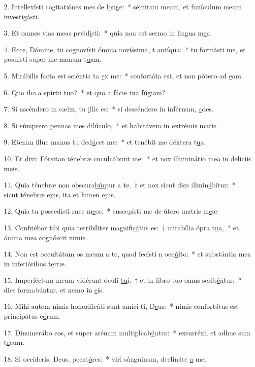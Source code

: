 2. Intellexísti cogitatiónes mes de l\uline{o}nge:~* sémitam meam, et funículum meum investig\uline{á}sti.\par 
3. Et omnes vias meas prvid\uline{í}sti:~* quia non est sermo in lingua m\uline{e}a.\par 
4. Ecce, Dómine, tu cognovísti ómnia novíssima, t ant\uline{í}qua:~* tu formásti me, et posuísti super me manum t\uline{u}am.\par 
5. Mirábilis facta est sciéntia ta \uline{e}x me:~* confortáta est, et non pótero ad \uline{e}am.\par 
6. Quo ibo a spírtu t\uline{u}o?~* et quo a fácie tua f\uline{ú}giam?\par 
7. Si ascéndero in cælm, tu \uline{i}llic es:~* si descéndero in inférnum, \uline{a}des.\par 
8. Si súmpsero pennas mes dil\uline{ú}culo,~* et habitávero in extrémis m\uline{a}ris.\par 
9. Etenim illuc manus tu ded\uline{ú}cet me:~* et tenébit me déxtera t\uline{u}a.\par 
10. Et dixi: Fórsitan ténebræ cnculc\uline{á}bunt me:~* et nox illuminátio mea in delíciis m\uline{e}is.\par 
11. Quia ténebræ non obscura\uline{bún}tur a te,~† et nox sicut dies illmin\uline{á}bitur:~* sicut ténebræ ejus, ita et lumen \uline{e}jus.\par 
12. Quia tu possedísti rnes m\uline{e}os:~* suscepísti me de útero matris m\uline{e}æ.\par 
13. Confitébor tibi quia terribíliter magnifi\uline{cá}tus es:~† mirabília ópra t\uline{u}a,~* et ánima mea cognóscit n\uline{i}mis.\par 
14. Non est occultátum os meum a te, quod fecísti n occ\uline{ú}lto:~* et substántia mea in inferióribus t\uline{e}rræ.\par 
15. Imperféctum meum vidérunt óculi \uline{tu}i,~† et in libro tuo omns scrib\uline{é}ntur:~* dies formabúntur, et nemo in \uline{e}is.\par 
16. Mihi autem nimis honorificáti sunt amíci ti, D\uline{e}us:~* nimis confortátus est principátus e\uline{ó}rum.\par 
17. Dinumerábo eos, et super arénam multiplcab\uline{ú}ntur:~* exsurréxi, et adhuc sum t\uline{e}cum.\par 
18. Si occíderis, Deus, pccat\uline{ó}res:~* viri sánguinum, declináte \uline{a} me.\par 
